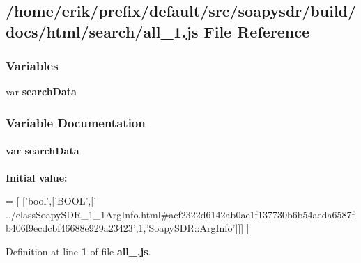 \subsection{/home/erik/prefix/default/src/soapysdr/build/docs/html/search/all\+\_\+1.js File Reference}
\label{all__1_8js}
\subsubsection*{Variables}
\begin{DoxyCompactItemize}
\item 
var {\bf search\+Data}
\end{DoxyCompactItemize}


\subsubsection{Variable Documentation}
\paragraph[{search\+Data}]{\setlength{\rightskip}{0pt plus 5cm}var search\+Data}\label{all__1_8js_ad01a7523f103d6242ef9b0451861231e}
{\bfseries Initial value\+:}
\begin{DoxyCode}
=
[
  [\textcolor{stringliteral}{'bool'},[\textcolor{stringliteral}{'BOOL'},[\textcolor{stringliteral}{'
      ../classSoapySDR\_1\_1ArgInfo.html#acf2322d6142ab0ae1f137730b6b54aeda6587fb406f9ecdcbf46688e929a23423'},1,\textcolor{stringliteral}{'SoapySDR::ArgInfo'}]]]
]
\end{DoxyCode}


Definition at line {\bf 1} of file {\bf all\+\_.\+js}.


